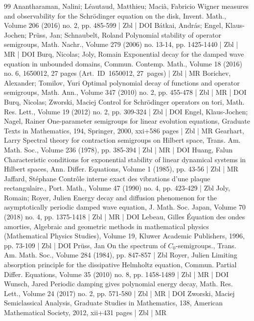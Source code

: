 \begin{thebibliography}{99}
Anantharaman, Nalini; Léautaud, Matthieu; Macià, Fabricio Wigner measures and observability for the Schrödinger equation on the disk, Invent. Math., Volume 206 (2016) no. 2, pp. 485-599 | Zbl | DOI
Bátkai, András; Engel, Klaus-Jochen; Prüss, Jan; Schnaubelt, Roland Polynomial stability of operator semigroups, Math. Nachr., Volume 279 (2006) no. 13-14, pp. 1425-1440 | Zbl | MR | DOI
Burq, Nicolas; Joly, Romain Exponential decay for the damped wave equation in unbounded domains, Commun. Contemp. Math., Volume 18 (2016) no. 6, 1650012, 27 pages (Art. ID 1650012, 27 pages) | Zbl | MR
Borichev, Alexander; Tomilov, Yuri Optimal polynomial decay of functions and operator semigroups, Math. Ann., Volume 347 (2010) no. 2, pp. 455-478 | Zbl | MR | DOI
Burq, Nicolas; Zworski, Maciej Control for Schrödinger operators on tori, Math. Res. Lett., Volume 19 (2012) no. 2, pp. 309-324 | Zbl | DOI
Engel, Klaus-Jochen; Nagel, Rainer One-parameter semigroups for linear evolution equations, Graduate Texts in Mathematics, 194, Springer, 2000, xxi+586 pages | Zbl | MR
Gearhart, Larry Spectral theory for contraction semigroups on Hilbert space, Trans. Am. Math. Soc., Volume 236 (1978), pp. 385-394 | Zbl | MR | DOI
Huang, Falun Characteristic conditions for exponential stability of linear dynamical systems in Hilbert spaces, Ann. Differ. Equations, Volume 1 (1985), pp. 43-56 | Zbl | MR
Jaffard, Stéphane Contrôle interne exact des vibrations d’une plaque rectangulaire., Port. Math., Volume 47 (1990) no. 4, pp. 423-429 | Zbl
Joly, Romain; Royer, Julien Energy decay and diffusion phenomenon for the asymptotically periodic damped wave equation, J. Math. Soc. Japan, Volume 70 (2018) no. 4, pp. 1375-1418 | Zbl | MR | DOI
Lebeau, Gilles Équation des ondes amorties, Algebraic and geometric methods in mathematical physics (Mathematical Physics Studies), Volume 19, Kluwer Academic Publishers, 1996, pp. 73-109 | Zbl | DOI
Prüss, Jan On the spectrum of ${C}_0$-semigroups., Trans. Am. Math. Soc., Volume 284 (1984), pp. 847-857 | Zbl
Royer, Julien Limiting absorption principle for the dissipative Helmholtz equation, Commun. Partial Differ. Equations, Volume 35 (2010) no. 8, pp. 1458-1489 | Zbl | MR | DOI
Wunsch, Jared Periodic damping gives polynomial energy decay, Math. Res. Lett., Volume 24 (2017) no. 2, pp. 571-580 | Zbl | MR | DOI
Zworski, Maciej Semiclassical Analysis, Graduate Studies in Mathematics, 138, American Mathematical Society, 2012, xii+431 pages | Zbl | MR
\end{thebibliography}
